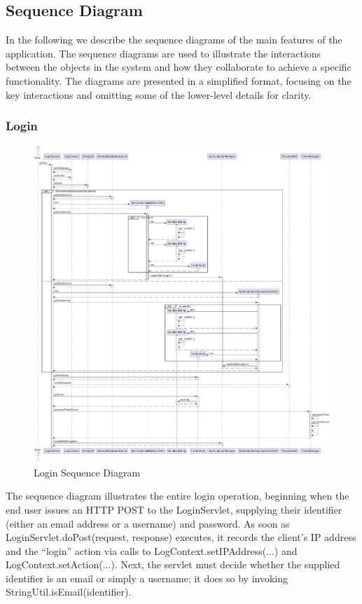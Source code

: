 \subsection{Sequence Diagram}

In the following we describe the sequence diagrams of the main features of the application. 
The sequence diagrams are used to illustrate the interactions between the objects in the system and how they collaborate to achieve a specific functionality. 
The diagrams are presented in a simplified format, focusing on the key interactions and omitting some of the lower-level details for clarity.

\subsubsection{Login}
\begin{figure}[H]
    \centering
    \includegraphics[width=\textwidth]{images/sequence_diagrams/Login.pdf}
    \caption{Login Sequence Diagram}
\end{figure}

The sequence diagram illustrates the entire login operation, beginning when the end user issues an HTTP POST to the LoginServlet, supplying their identifier (either an email address or a username) and password. As soon as LoginServlet.doPost(request, response) executes, it records the client’s IP address and the “login” action via calls to LogContext.setIPAddress(...) and LogContext.setAction(...). Next, the servlet must decide whether the supplied identifier is an email or simply a username; it does so by invoking StringUtil.isEmail(identifier).

